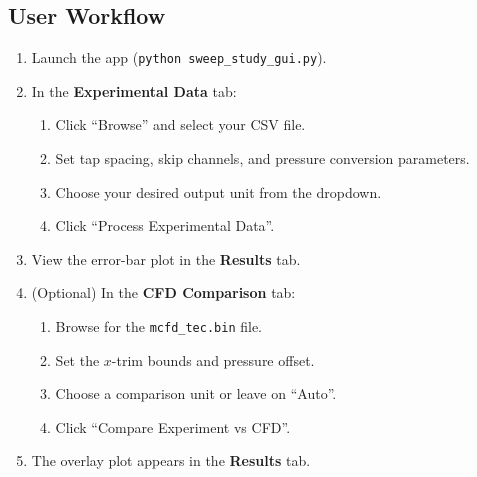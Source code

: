 \documentclass[11pt, letterpaper]{article}
\begin{document}
\subsection{User Workflow}

\begin{enumerate}
    \item Launch the app (\texttt{python sweep\_study\_gui.py}).
    \item In the \textbf{Experimental Data} tab:
    \begin{enumerate}[nosep]
        \item Click ``Browse'' and select your CSV file.
        \item Set tap spacing, skip channels, and pressure conversion
              parameters.
        \item Choose your desired output unit from the dropdown.
        \item Click ``Process Experimental Data''.
    \end{enumerate}
    \item View the error-bar plot in the \textbf{Results} tab.
    \item (Optional) In the \textbf{CFD Comparison} tab:
    \begin{enumerate}[nosep]
        \item Browse for the \texttt{mcfd\_tec.bin} file.
        \item Set the $x$-trim bounds and pressure offset.
        \item Choose a comparison unit or leave on ``Auto''.
        \item Click ``Compare Experiment vs CFD''.
    \end{enumerate}
    \item The overlay plot appears in the \textbf{Results} tab.
\end{enumerate}
\end{document}

